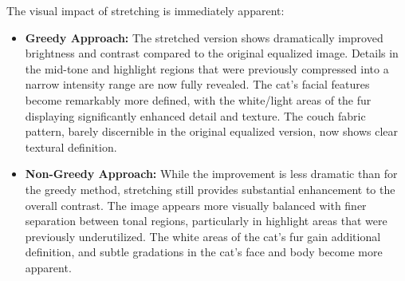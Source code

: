 \documentclass[12pt,a4paper]{article}
\begin{document}
The visual impact of stretching is immediately apparent:

\begin{itemize}
    \item \textbf{Greedy Approach:} The stretched version shows dramatically improved brightness and contrast compared to the original equalized image. Details in the mid-tone and highlight regions that were previously compressed into a narrow intensity range are now fully revealed. The cat's facial features become remarkably more defined, with the white/light areas of the fur displaying significantly enhanced detail and texture. The couch fabric pattern, barely discernible in the original equalized version, now shows clear textural definition. 
    
    \item \textbf{Non-Greedy Approach:} While the improvement is less dramatic than for the greedy method, stretching still provides substantial enhancement to the overall contrast. The image appears more visually balanced with finer separation between tonal regions, particularly in highlight areas that were previously underutilized. The white areas of the cat's fur gain additional definition, and subtle gradations in the cat's face and body become more apparent.
\end{itemize}
\end{document}
